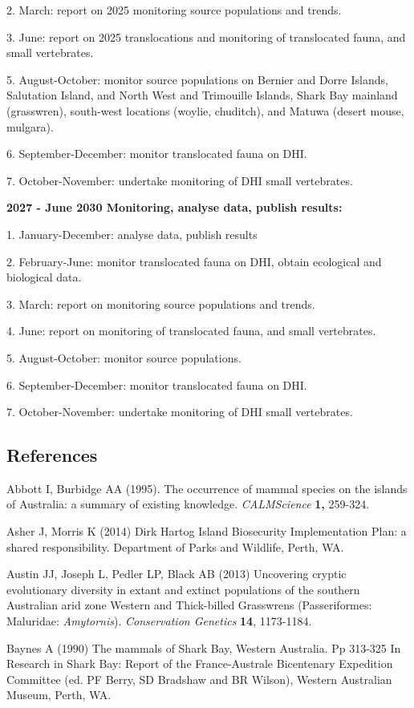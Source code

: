 \documentclass[version=last,
    paper=a4,                               %
    10pt,                                   %
    dvipsnames,
    oneside,                              %
    headings=openany,                       %
    open=any,
    BCOR=7mm,                               %
    DIV=15,     %
]{scrbook}
\begin{document}
2. March: report on 2025 monitoring source populations and trends.

3. June: report on 2025 translocations and monitoring of translocated
fauna, and small vertebrates.

5. August-October: monitor source populations on Bernier and Dorre
Islands, Salutation Island, and North West and Trimouille Islands, Shark
Bay mainland (grasswren), south-west locations (woylie, chuditch), and
Matuwa (desert mouse, mulgara).

6. September-December: monitor translocated fauna on DHI.

7. October-November: undertake monitoring of DHI small vertebrates.

\textbf{2027 - June 2030 Monitoring, analyse data, publish results:}

1. January-December: analyse data, publish results

2. February-June: monitor translocated fauna on DHI, obtain ecological
and biological data.

3. March: report on monitoring source populations and trends.

4. June: report on monitoring of translocated fauna, and small
vertebrates.

5. August-October: monitor source populations.

6. September-December: monitor translocated fauna on DHI.

7. October-November: undertake monitoring of DHI small vertebrates.




\subsection*{References}

Abbott I, Burbidge AA (1995). The occurrence of mammal species on the
islands of Australia: a summary of existing knowledge.
\emph{CALMScience} \textbf{1,} 259-324.

Asher J, Morris K (2014) Dirk Hartog Island Biosecurity Implementation
Plan: a shared responsibility. Department of Parks and Wildlife, Perth,
WA.

Austin JJ, Joseph L, Pedler LP, Black AB (2013) Uncovering cryptic
evolutionary diversity in extant and extinct populations of the southern
Australian arid zone Western and Thick-billed Grasswrens (Passeriformes:
Maluridae: \emph{Amytornis}). \emph{Conservation Genetics} \textbf{14},
1173-1184.

Baynes A (1990) The mammals of Shark Bay, Western Australia. Pp 313-325
In Research in Shark Bay: Report of the France-Australe Bicentenary
Expedition Committee (ed. PF Berry, SD Bradshaw and BR Wilson), Western
Australian Museum, Perth, WA.
\end{document}
